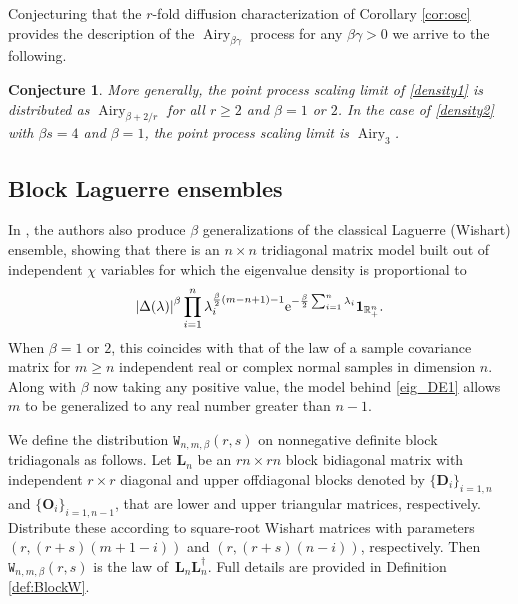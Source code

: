 \documentclass[pdftex]{sigma}
\numberwithin{equation}{section}
\newtheorem{Conjecture}[Theorem]{Conjecture}
\theoremstyle{definition}
\newcommand{\R}{{\mathbb R}}
\newcommand{\mbf}[1]{\mathbf{#1}}
\begin{document}
Conjecturing that the $r$-fold diffusion characterization of Corollary \ref{cor:osc} provides the description of the $\operatorname{Airy}_{\beta \gamma}$ process for any $\beta \gamma>0$ we arrive to the following.

\begin{Conjecture}
\label{con:betalimit}
More generally, the point process scaling limit of \eqref{density1} is distributed as $\operatorname{Airy}_{\beta+2/r}$ for all $r \ge 2$ and $\beta =1$ or $2$. In the case of \eqref{density2} with $\beta s = 4$ and $\beta=1$, the point process scaling limit is $\operatorname{Airy}_{3}$.
\end{Conjecture}

\subsection{Block Laguerre ensembles}

In \cite{DE}, the authors also produce $\beta$ generalizations of the classical Laguerre (Wishart) ensemble, showing that there is an $n\times n$ tridiagonal matrix model built out of independent $\chi$ variables for which the
eigenvalue density is proportional to
\begin{equation}
\label{eig_DE1}
\left|\Delta(\lambda)\right|^\beta
\prod_{i=1}^n \lambda_i^{\frac{\beta}{2}(m-n+1) -1} {\rm e}^{-\frac{\beta}{2} \sum_{i=1}^n \lambda_i} \mathbf{1}_{\R_+^n}.
\end{equation}
When $\beta =1$ or $2$, this coincides with that of the law of a sample covariance matrix for $m\ge n$ independent real or complex normal
samples in dimension $n$.
Along with $\beta$ now taking any positive value, the model behind \eqref{eig_DE1} allows $m$ to be generalized to any real number greater than $n-1$.



We define the distribution $\mathtt{W}_{n,m, \beta}(r, s)$ on nonnegative definite block tridiagonals as follows. Let $\mathbf{L}_n$
be an $rn \times rn$ block bidiagonal matrix with independent $r\times r$ diagonal and upper offdiagonal blocks denoted by
$\{\mbf{D}_i\}_{i=1,n}$ and $\{\mbf{O}_i\}_{i=1, n-1}$, that are lower and upper triangular matrices, respectively.
 Distribute these according to
square-root Wishart matrices with parameters
$(r, (r+s)(m+1 -i))$ and $(r, (r+s)(n-i))$, respectively. Then $\mathtt{W}_{n, m, \beta}(r, s)$ is the
law of~$\mbf{L}_n \mbf{L}_n^\dagger$. Full details are provided in Definition \ref{def:BlockW}.
\end{document}

